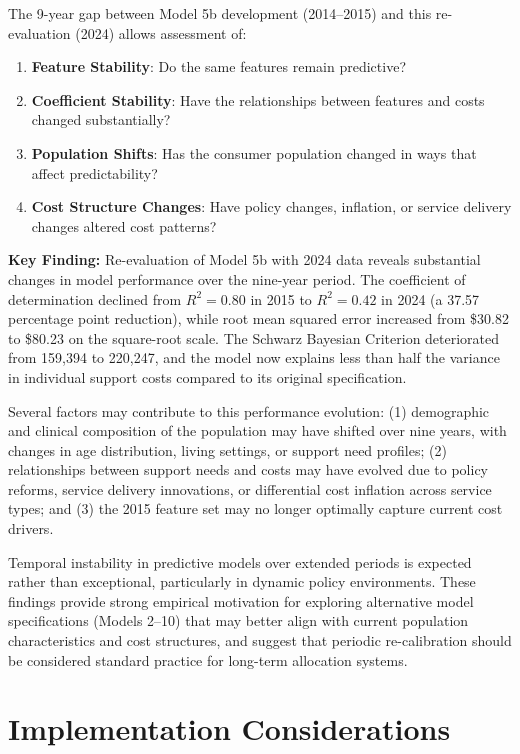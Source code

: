 The 9-year gap between Model 5b development (2014--2015) and this re-evaluation (2024) allows assessment of:

\begin{enumerate}
    \item \textbf{Feature Stability}: Do the same features remain predictive?
    \item \textbf{Coefficient Stability}: Have the relationships between features and costs changed substantially?
    \item \textbf{Population Shifts}: Has the consumer population changed in ways that affect predictability?
    \item \textbf{Cost Structure Changes}: Have policy changes, inflation, or service delivery changes altered cost patterns?
\end{enumerate}

\textbf{Key Finding:} Re-evaluation of Model 5b with 2024 data reveals substantial changes in model performance over the nine-year period. The coefficient of determination declined from $R^2 = 0.80$ in 2015 to $R^2 = 0.42$ in 2024 (a 37.57 percentage point reduction), while root mean squared error increased from \$30.82 to \$80.23 on the square-root scale. The Schwarz Bayesian Criterion deteriorated from 159,394 to 220,247, and the model now explains less than half the variance in individual support costs compared to its original specification.

Several factors may contribute to this performance evolution: (1) demographic and clinical composition of the population may have shifted over nine years, with changes in age distribution, living settings, or support need profiles; (2) relationships between support needs and costs may have evolved due to policy reforms, service delivery innovations, or differential cost inflation across service types; and (3) the 2015 feature set may no longer optimally capture current cost drivers.

Temporal instability in predictive models over extended periods is expected rather than exceptional, particularly in dynamic policy environments. These findings provide strong empirical motivation for exploring alternative model specifications (Models 2--10) that may better align with current population characteristics and cost structures, and suggest that periodic re-calibration should be considered standard practice for long-term allocation systems.

\section{Implementation Considerations}

